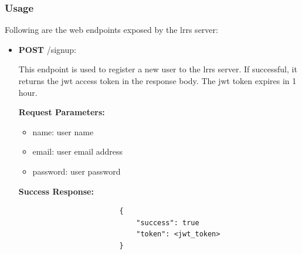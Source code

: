 \documentclass[12pt]{article}
\begin{document}
        \subsubsection{Usage}
        Following are the web endpoints exposed by the \acrshort{lrrs} server:
        \begin{itemize}
            \item \textbf{POST} /signup:
                \begin{addmargin}[1em]{2em}%
                    This endpoint is used to register a new user to the \acrshort{lrrs} server. If successful, it returns the jwt access token in the response body. The jwt token expires in 1 hour.
                    \par\textbf{Request Parameters:}
                    \begin{itemize}
                        \item name: user name
                        \item email: user email address
                        \item password: user password
                    \end{itemize}
                    \par\textbf{Success Response:}
                    \begin{listing}[H]
                    \begin{verbatim}
                        {     
                            "success": true
                            "token": <jwt_token>
                        }
                    \end{verbatim}
                    \end{listing}
                \end{addmargin}
                

\end{itemize}
\end{document}
